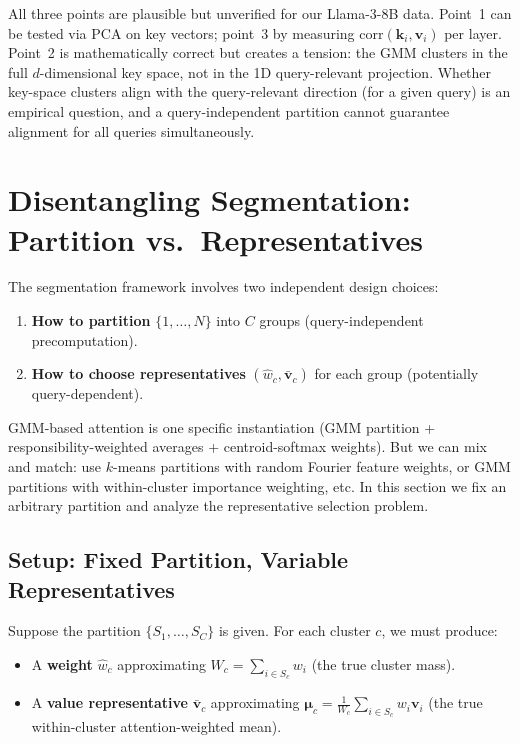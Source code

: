 \documentclass[11pt,a4paper]{article}
\theoremstyle{definition}
\newcommand{\vv}{\mathbf{v}}
\newcommand{\kk}{\mathbf{k}}
\newcommand{\bmu}{\boldsymbol{\mu}}
\begin{document}
\begin{researchnote}
All three points are plausible but unverified for our Llama-3-8B data.
Point~1 can be tested via PCA on key vectors; point~3 by measuring
$\mathrm{corr}(\kk_i,\vv_i)$ per layer.  Point~2 is mathematically
correct but creates a tension: the GMM clusters in the full $d$-dimensional
key space, not in the 1D query-relevant projection.  Whether key-space clusters
align with the query-relevant direction (for a given query) is an empirical
question, and a query-independent partition cannot guarantee alignment for all
queries simultaneously.
\end{researchnote}


\section{Disentangling Segmentation: Partition vs.\ Representatives}
\label{sec:disentangle}

The segmentation framework involves two independent design choices:
\begin{enumerate}
  \item \textbf{How to partition} $\{1,\dots,N\}$ into $C$ groups
    (query-independent precomputation).
  \item \textbf{How to choose representatives} $(\hat{w}_c, \bar{\vv}_c)$
    for each group (potentially query-dependent).
\end{enumerate}
GMM-based attention is one specific instantiation (GMM partition +
responsibility-weighted averages + centroid-softmax weights).  But we can
mix and match: use $k$-means partitions with random Fourier feature weights,
or GMM partitions with within-cluster importance weighting, etc.
In this section we fix an arbitrary partition and analyze the representative
selection problem.

\subsection{Setup: Fixed Partition, Variable Representatives}

Suppose the partition $\{S_1,\dots,S_C\}$ is given.
For each cluster $c$, we must produce:
\begin{itemize}[nosep]
  \item A \textbf{weight} $\hat{w}_c$ approximating
    $W_c = \sum_{i\in S_c}w_i$ (the true cluster mass).
  \item A \textbf{value representative} $\bar{\vv}_c$ approximating
    $\bmu_c = \frac{1}{W_c}\sum_{i\in S_c}w_i\vv_i$ (the true
    within-cluster attention-weighted mean).
\end{itemize}
\end{document}
